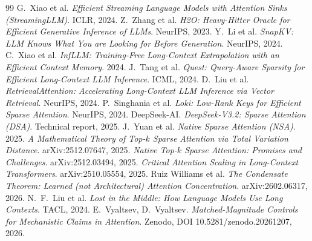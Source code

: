 \documentclass[11pt]{article}
\begin{document}
\begin{thebibliography}{99}
\small
{} G.\ Xiao et al. \emph{Efficient Streaming Language Models with Attention Sinks (StreamingLLM)}. ICLR, 2024.
 Z.\ Zhang et al. \emph{H2O: Heavy-Hitter Oracle for Efficient Generative Inference of LLMs}. NeurIPS, 2023.
 Y.\ Li et al. \emph{SnapKV: LLM Knows What You are Looking for Before Generation}. NeurIPS, 2024.
 C.\ Xiao et al. \emph{InfLLM: Training-Free Long-Context Extrapolation with an Efficient Context Memory}. 2024.
 J.\ Tang et al. \emph{Quest: Query-Aware Sparsity for Efficient Long-Context LLM Inference}. ICML, 2024.
 D.\ Liu et al. \emph{RetrievalAttention: Accelerating Long-Context LLM Inference via Vector Retrieval}. NeurIPS, 2024.
 P.\ Singhania et al. \emph{Loki: Low-Rank Keys for Efficient Sparse Attention}. NeurIPS, 2024.
 DeepSeek-AI. \emph{DeepSeek-V3.2: Sparse Attention (DSA)}. Technical report, 2025.
 J.\ Yuan et al. \emph{Native Sparse Attention (NSA)}. 2025.
 \emph{A Mathematical Theory of Top-$k$ Sparse Attention via Total Variation Distance}. arXiv:2512.07647, 2025.
 \emph{Native Top-$k$ Sparse Attention: Promises and Challenges}. arXiv:2512.03494, 2025.
 \emph{Critical Attention Scaling in Long-Context Transformers}. arXiv:2510.05554, 2025.
 Ruiz Williams et al. \emph{The Condensate Theorem: Learned (not Architectural) Attention Concentration}. arXiv:2602.06317, 2026.
 N.\ F.\ Liu et al. \emph{Lost in the Middle: How Language Models Use Long Contexts}. TACL, 2024.
 E.\ Vyaltsev, D.\ Vyaltsev. \emph{Matched-Magnitude Controls for Mechanistic Claims in Attention}. Zenodo, DOI 10.5281/zenodo.20261207, 2026.
\end{thebibliography}
\end{document}
